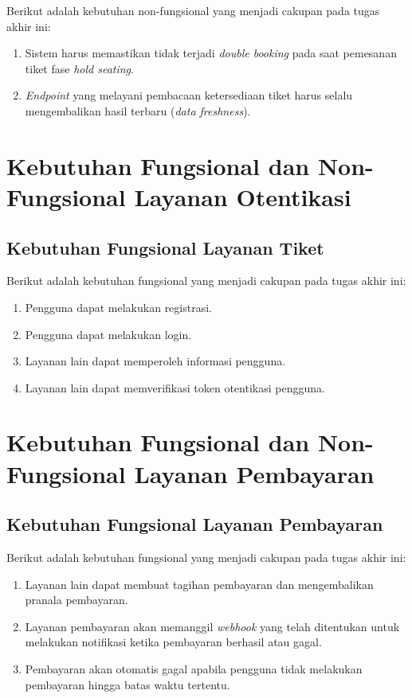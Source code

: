 Berikut adalah kebutuhan non-fungsional yang menjadi cakupan pada tugas akhir ini:

\begin{enumerate}
    \item Sistem harus memastikan tidak terjadi \textit{double booking} pada saat pemesanan tiket fase \textit{hold seating}.
    \item \textit{Endpoint} yang melayani pembacaan ketersediaan tiket harus selalu mengembalikan hasil terbaru (\textit{data freshness}).
\end{enumerate}

\section{Kebutuhan Fungsional dan Non-Fungsional Layanan Otentikasi}

\subsection{Kebutuhan Fungsional Layanan Tiket}

Berikut adalah kebutuhan fungsional yang menjadi cakupan pada tugas akhir ini:

\begin{enumerate}
    \item Pengguna dapat melakukan registrasi.
    \item Pengguna dapat melakukan login.
    \item Layanan lain dapat memperoleh informasi pengguna.
    \item Layanan lain dapat memverifikasi token otentikasi pengguna.
\end{enumerate}

\section{Kebutuhan Fungsional dan Non-Fungsional Layanan Pembayaran}

\subsection{Kebutuhan Fungsional Layanan Pembayaran}

Berikut adalah kebutuhan fungsional yang menjadi cakupan pada tugas akhir ini:

\begin{enumerate}
    \item Layanan lain dapat membuat tagihan pembayaran dan mengembalikan pranala pembayaran.
    \item Layanan pembayaran akan memanggil \textit{webhook} yang telah ditentukan untuk melakukan notifikasi ketika pembayaran berhasil atau gagal.
    \item Pembayaran akan otomatis gagal apabila pengguna tidak melakukan pembayaran hingga batas waktu tertentu.
\end{enumerate}

